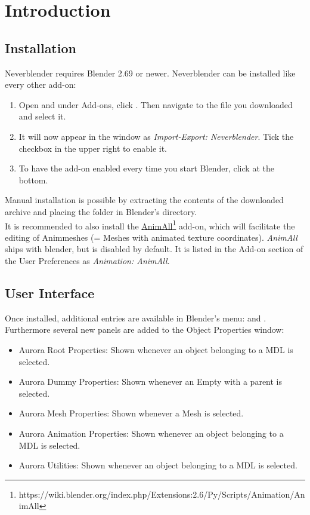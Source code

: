 \chapter{Introduction}

\section{Installation}
Neverblender requires Blender 2.69 or newer. Neverblender can be installed
like every other add-on: \\
\begin{enumerate}
\item Open  and under Add-ons, 
click . Then navigate to the file you downloaded and select it.
\item It will now appear in the window as \textit{Import-Export: Neverblender}. Tick the checkbox in the upper right to enable it.
\item To have the add-on enabled every time you start Blender, click  at the bottom.
\end{enumerate}
Manual installation is possible by extracting the contents of the downloaded archive and 
placing the  folder in Blender's  directory.\\

It is recommended to also install the \href{https://wiki.blender.org/index.php/Extensions:2.6/Py/Scripts/Animation/AnimAll}{AnimAll}\footnote{https://wiki.blender.org/index.php/Extensions:2.6/Py/Scripts/Animation/AnimAll} add-on, which will facilitate the editing of Animmeshes (= Meshes with animated texture coordinates). \textit{AnimAll} ships with blender, but is disabled by default. It is listed in the Add-on section of the User Preferences as \textit{Animation: AnimAll}.

\section{User Interface}
Once installed, additional entries are available in Blender's menu:  and 
. Furthermore several new panels are added to the Object Properties window:
\begin{itemize}
\item Aurora Root Properties: Shown whenever an object belonging to a MDL is selected.
\item Aurora Dummy Properties: Shown whenever an Empty with a parent is selected.
\item Aurora Mesh Properties: Shown whenever a Mesh is selected.
\item Aurora Animation Properties: Shown whenever an object belonging to a MDL is selected.
\item Aurora Utilities: Shown whenever an object belonging to a MDL is selected.
\end{itemize}
